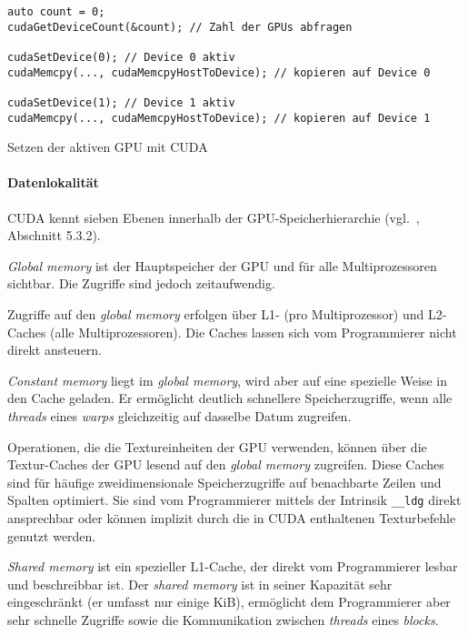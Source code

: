\begin{code}
    \begin{verbatim}
auto count = 0;
cudaGetDeviceCount(&count); // Zahl der GPUs abfragen

cudaSetDevice(0); // Device 0 aktiv
cudaMemcpy(..., cudaMemcpyHostToDevice); // kopieren auf Device 0

cudaSetDevice(1); // Device 1 aktiv
cudaMemcpy(..., cudaMemcpyHostToDevice); // kopieren auf Device 1
    \end{verbatim}
    \caption{Setzen der aktiven GPU mit CUDA}
    \label{vergleich:cuda:datensicht:setdevice}
\end{code}

\paragraph{Datenlokalität}

CUDA kennt sieben Ebenen innerhalb der GPU-Speicherhierarchie
(vgl.~\cite{cudaguide}, Abschnitt 5.3.2).

\textit{Global memory} ist der Hauptspeicher der GPU und für alle
Multiprozessoren sichtbar. Die Zugriffe sind jedoch zeitaufwendig.

Zugriffe auf den \textit{global memory} erfolgen über L1- (pro Multiprozessor)
und L2-Caches (alle Multiprozessoren). Die Caches lassen sich vom Programmierer
nicht direkt ansteuern.

\textit{Constant memory} liegt im \textit{global memory}, wird aber auf eine
spezielle Weise in den Cache geladen. Er ermöglicht deutlich schnellere
Speicherzugriffe, wenn alle \textit{threads} eines \textit{warps} gleichzeitig
auf dasselbe Datum zugreifen.

Operationen, die die Textureinheiten der GPU verwenden, können über die
Textur-Caches der GPU lesend auf den \textit{global memory} zugreifen. Diese
Caches sind für häufige zweidimensionale Speicherzugriffe auf benachbarte Zeilen
und Spalten optimiert. Sie sind vom Programmierer mittels der Intrinsik
\texttt{\_\_ldg} direkt ansprechbar oder können implizit durch die in CUDA
enthaltenen Texturbefehle genutzt werden.

\textit{Shared memory} ist ein spezieller L1-Cache, der direkt vom Programmierer
lesbar und beschreibbar ist. Der \textit{shared memory} ist in seiner Kapazität
sehr eingeschränkt (er umfasst nur einige KiB), ermöglicht dem Programmierer
aber sehr schnelle Zugriffe sowie die Kommunikation zwischen \textit{threads}
eines \textit{blocks}.

